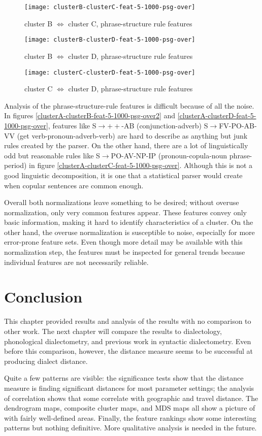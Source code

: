 \begin{figure}
  \texttt{[image: clusterB-clusterC-feat-5-1000-psg-over]}
  \caption{cluster B $\Leftrightarrow$ cluster C, phrase-structure rule features}
\end{figure}
\begin{figure}
  \texttt{[image: clusterB-clusterD-feat-5-1000-psg-over]}
  \caption{cluster B $\Leftrightarrow$ cluster D, phrase-structure rule features}
\end{figure}
\begin{figure}
  \texttt{[image: clusterC-clusterD-feat-5-1000-psg-over]}
  \caption{cluster C $\Leftrightarrow$ cluster D, phrase-structure rule features}
\end{figure}

Analysis of the phrase-structure-rule features is difficult because of
all the noise. In figures
\ref{clusterA-clusterB-feat-5-1000-psg-over2} and
\ref{clusterA-clusterD-feat-5-1000-psg-over}, features like
S$\to++$-AB (conjunction-adverb) S$\to$FV-PO-AB-VV (get
verb-pronoun-adverb-verb) are hard to describe as anything but junk
rules created by the parser. On the other hand, there are a lot of
linguistically odd but reasonable rules like S$\to$PO-AV-NP-IP
(pronoun-copula-noun phrase-period) in figure
\ref{clusterA-clusterC-feat-5-1000-psg-over}. Although this is not a
good linguistic decomposition, it is one that a statistical parser
would create when copular sentences are
common enough.

Overall both normalizations leave something to be desired; without
overuse normalization, only very common features appear. These
features convey only basic information, making it hard to identify
characteristics of a cluster. On the other hand, the overuse
normalization is susceptible to noise, especially for more error-prone
feature sets. Even though more detail may be available with this
normalization step, the features must be inspected for general trends
because individual features are not necessarily reliable.

\section{Conclusion}

This chapter provided results and analysis of the results with no
comparison to other work. The next chapter
will compare the results to dialectology, phonological dialectometry,
and previous work in syntactic dialectometry. Even before this
comparison, however, the distance measure seems to be successful at
producing dialect distance.

Quite a few patterns are visible: the significance tests show that the
distance measure is finding significant distances for most parameter
settings; the analysis of correlation shows that some correlate with
geographic and travel distance. The dendrogram maps, composite cluster
maps, and MDS maps all show a picture of with fairly well-defined areas.
Finally, the feature rankings show some interesting patterns but
nothing definitive. More qualitative analysis is needed in the future.


